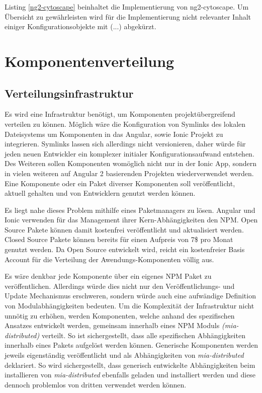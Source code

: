 

Listing \ref{ng2-cytoscape} beinhaltet die Implementierung von ng2-cytoscape.
Um Übersicht zu gewährleisten wird für die Implementierung nicht relevanter Inhalt einiger Konfigurationsobjekte mit (...) abgekürzt.




\newpage
\section{Komponentenverteilung}

\subsection{Verteilungsinfrastruktur}

Es wird eine Infrastruktur benötigt, um Komponenten projektübergreifend verteilen zu können.
Möglich wäre die Konfiguration von Symlinks des lokalen Dateisystems um Komponenten in das Angular,
sowie Ionic Projekt zu integrieren. Symlinks lassen sich allerdings nicht versionieren, daher würde
für jeden neuen Entwickler ein komplexer initialer Konfigurationsaufwand entstehen.
Des Weiteren sollen Komponenten womöglich nicht nur in der Ionic App,
sondern in vielen weiteren auf Angular 2 basierenden Projekten wiederverwendet werden.
Eine Komponente oder ein Paket diverser Komponenten soll veröffentlicht, aktuell
gehalten und von Entwicklern genutzt werden können.

Es liegt nahe dieses Problem mithilfe eines Paketmanagers zu lösen. Angular und Ionic verwenden für das Management
ihrer Kern-Abhängigkeiten den \ac{NPM}.
Open Source Pakete können damit kostenfrei veröffentlicht und aktualisiert werden. Closed Source Pakete können
bereits für einen Aufpreis von 7\$ pro Monat genutzt werden.
Da \projectname{} Open Source entwickelt wird,
reicht ein kostenfreier Basis Account für die Verteilung der Awendungs-Komponenten völlig aus.

Es wäre denkbar jede Komponente über ein eigenes \ac{NPM} Paket zu veröffentlichen.
Allerdings würde dies nicht nur den Veröffentlichungs- und Update Mechanismus erschweren,
sondern würde auch eine aufwändige Definition von Modulabhängigkeiten bedeuten.
Um die Komplexität der Infrastruktur nicht unnötig zu erhöhen,
werden Komponenten, welche anhand des spezifischen Ansatzes entwickelt werden,
gemeinsam innerhalb eines \ac{NPM} Moduls \emph{(mia-distributed)} verteilt.
So ist sichergestellt, dass alle spezifischen Abhängigkeiten innerhalb eines Pakets aufgelöst werden können.
Generische Komponenten werden jeweils eigenständig veröffentlicht und als Abhängigkeiten von \emph {mia-distributed} deklariert.
So wird sichergestellt, dass generisch entwickelte Abhängigkeiten beim installieren von \emph{mia-distributed}
ebenfalls geladen und installiert werden und diese dennoch problemlos von dritten verwendet werden können.

